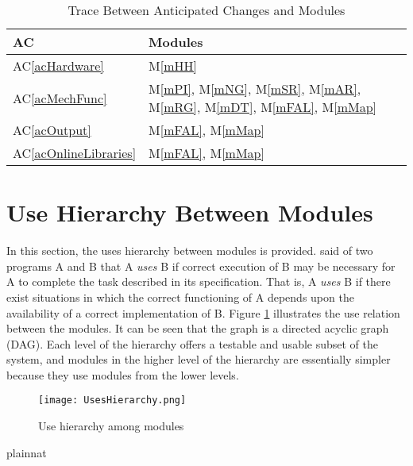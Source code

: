 \documentclass[12pt, titlepage]{article}
\newcommand{\acref}[1]{AC\ref{#1}}
\newcommand{\mref}[1]{M\ref{#1}}
\begin{document}
\begin{table}[H]
\centering
\begin{tabular}{p{} p{}}
\toprule
\textbf{AC} & \textbf{Modules}\\
\midrule
\acref{acHardware} & \mref{mHH}\\
\acref{acMechFunc} & \mref{mPI}, \mref{mNG}, \mref{mSR}, \mref{mAR}, \mref{mRG}, \mref{mDT}, \mref{mFAL}, \mref{mMap}\\
\acref{acOutput} & \mref{mFAL}, \mref{mMap}\\
\acref{acOnlineLibraries} & \mref{mFAL}, \mref{mMap}\\
\bottomrule
\end{tabular}
\caption{Trace Between Anticipated Changes and Modules}
\label{TblACT}
\end{table}

\section{Use Hierarchy Between Modules} \label{SecUse}

In this section, the uses hierarchy between modules is
provided. \citet{Parnas1978} said of two programs A and B that A {\em uses} B if
correct execution of B may be necessary for A to complete the task described in
its specification. That is, A {\em uses} B if there exist situations in which
the correct functioning of A depends upon the availability of a correct
implementation of B.  Figure \ref{FigUH} illustrates the use relation between
the modules. It can be seen that the graph is a directed acyclic graph
(DAG). Each level of the hierarchy offers a testable and usable subset of the
system, and modules in the higher level of the hierarchy are essentially simpler
because they use modules from the lower levels.

\begin{figure}[H]
\centering
\texttt{[image: UsesHierarchy.png]}
\caption{Use hierarchy among modules}
\label{FigUH}
\end{figure}


 {plainnat}

%

\newpage{}
\end{document}
